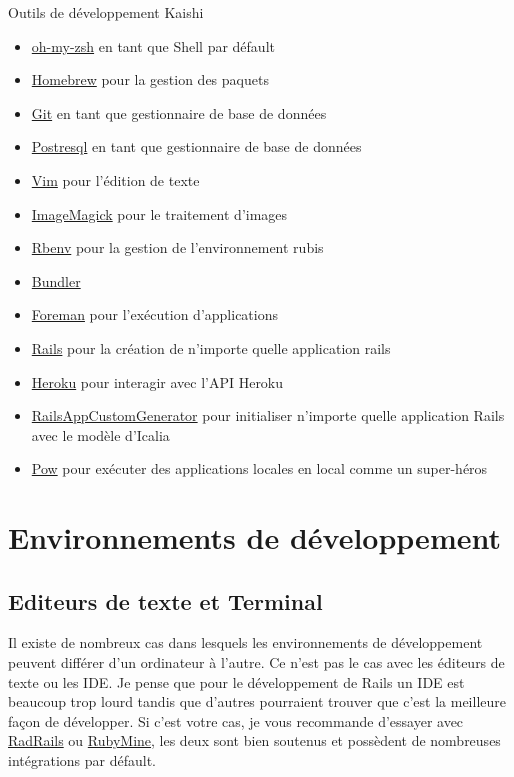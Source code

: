 \documentclass[]{report}
\begin{document}
    \begin{tcolorbox}{Outils de développement Kaishi}
      \begin{itemize}
        \item \href{https://github.com/robbyrussell/oh-my-zsh}{oh-my-zsh}  en tant que Shell par défault
        \item \href{http://brew.sh/}{Homebrew} pour la gestion des paquets
        \item \href{http://git-scm.com/}{Git} en tant que gestionnaire de base de données
        \item \href{http://www.postgresql.org/}{Postresql} en tant que gestionnaire de base de données
        \item \href{http://www.vim.org/}{Vim} pour l'édition de texte
        \item \href{http://www.imagemagick.org/}{ImageMagick} pour le traitement d'images
        \item \href{https://github.com/sstephenson/rbenv}{Rbenv} pour la gestion de l'environnement rubis
        \item \href{http://bundler.io/}{Bundler}
        \item \href{https://github.com/ddollar/foreman}{Foreman} pour l'exécution d'applications
        \item \href{http://rubyonrails.org/}{Rails} pour la création de n'importe quelle application rails
        \item \href{https://toolbelt.heroku.com/}{Heroku} pour interagir avec l'API Heroku
        \item \href{https://github.com/IcaliaLabs/railsAppCustomGenerator}{RailsAppCustomGenerator} pour initialiser n'importe quelle application Rails avec le modèle d'Icalia
        \item \href{http://pow.cx/}{Pow} pour exécuter des applications locales en local comme un super-héros
      \end{itemize}
    \end{tcolorbox}

  \section{Environnements de développement}

    \subsection{Editeurs de texte et Terminal}

      Il existe de nombreux cas dans lesquels les environnements de développement peuvent différer d'un ordinateur à l'autre. Ce n'est pas le cas avec les éditeurs de texte ou les IDE. Je pense que pour le développement de Rails un IDE est beaucoup trop lourd tandis que d'autres pourraient trouver que c'est la meilleure façon de développer. Si c'est votre cas, je vous recommande d'essayer avec \href{http://www.aptana.com/products/radrails}{RadRails} ou \href{http://www.jetbrains.com/ruby/index.html}{RubyMine}, les deux sont bien soutenus et possèdent de nombreuses intégrations par défault.
\end{document}
